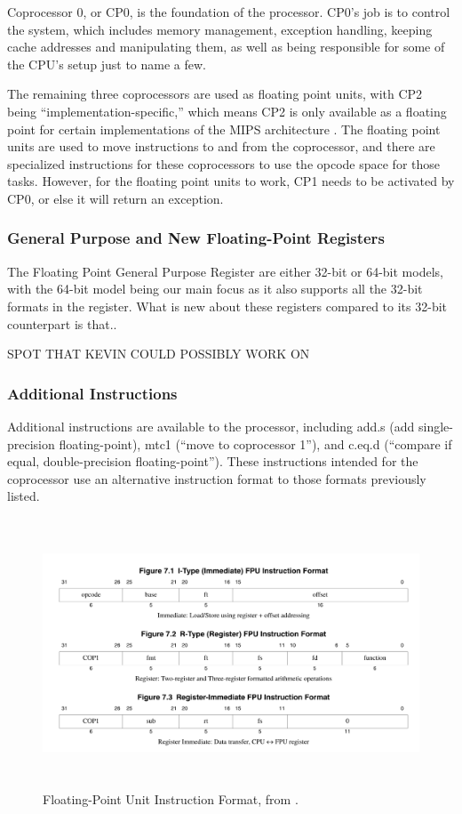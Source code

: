 \documentclass[
    parskip=half,
    fontsize=12pt,
    titlepage=firstiscover,
    toc=bibliography,
    numbers=endperiod
]{scrartcl}
\begin{document}
Coprocessor 0, or CP0, is the foundation of the processor. CP0's job is
to control the system, which includes memory management, exception
handling, keeping cache addresses and manipulating them, as well as
being responsible for some of the CPU's setup just to name a few.

The remaining three coprocessors are used as floating point units, with
CP2 being ``implementation-specific,'' which means CP2 is only available
as a floating point for certain implementations of the MIPS
architecture \cite[p.~74]{mips-specification}. The floating point units are used to move instructions to
and from the coprocessor, and there are specialized instructions for
these coprocessors to use the opcode space for those tasks. However, for
the floating point units to work, CP1 needs to be activated by CP0, or
else it will return an exception.

\subsubsection{General Purpose and New Floating-Point Registers}


The Floating Point General Purpose Register are either 32-bit or 64-bit
models, with the 64-bit model being our main focus as it also supports
all the 32-bit formats in the register. What is new about these
registers compared to its 32-bit counterpart is that..

SPOT THAT KEVIN COULD POSSIBLY WORK ON

\subsubsection{Additional Instructions}

Additional instructions are available to the processor, including add.s
(add single-precision floating-point), mtc1 (``move to coprocessor 1''),
and c.eq.d (``compare if equal, double-precision floating-point''). These
instructions intended for the coprocessor use an alternative instruction
format to those formats previously listed.

\begin{figure}[H]
    \includegraphics[height=8cm]{fpu-instruction-formats}
    \caption{Floating-Point Unit Instruction Format, from \protect\cite{mips-specification}.}
\end{figure}
\end{document}
